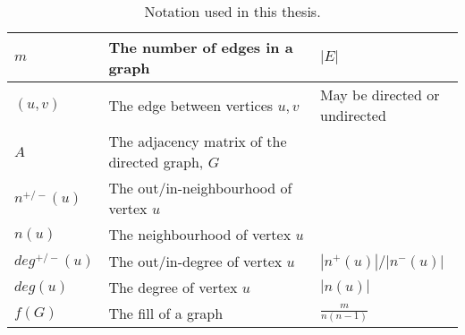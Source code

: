 \begin{table}
\begin{adjustwidth}{-0.75in}{-0.75in}
\begin{tabular}{ |p{2cm}|p{6cm}|p{5cm}|  }
            $m$              & The number of edges in a graph                                                                                      & $|E|$                   \\
            \hline

            $(u, v)$         & The edge between vertices $u, v$                                                                                    & May be directed or undirected \\
            \hline

            $A$              & The adjacency matrix of the directed graph, $G$                                                                     &                               \\
            \hline
            $n^{+/-}(u)$       & The out/in-neighbourhood of vertex $u$                                                                                 &                               \\
            \hline
            $n(u)$       & The neighbourhood of vertex $u$                                                                                  &                               \\
            \hline
            $deg^{+/-}(u)$     & The out/in-degree of vertex $u$ & $|n^{+}(u)|$/$|n^{-}(u)| $           \\
            \hline
            $deg(u)$     & The degree of vertex $u$   & $|n(u)|$            \\
            \hline
            $f(G)$     & The fill of a graph & $\frac{m}{n(n-1)}$            \\
            \hline
        \end{tabular}
        \caption{\label{tab:notation}Notation used in this thesis.}
    \end{adjustwidth}
\end{table}


